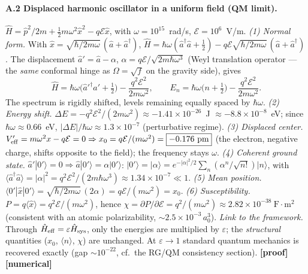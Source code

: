 \documentclass[11pt,a4paper]{article}
\newcommand{\st}[1]{\textbf{\textcolor{blue!45!black}{[#1]}}}
\begin{document}
\paragraph{A.2 Displaced harmonic oscillator in a uniform field (QM limit).}
$\hat H=\hat p^2/2m+\tfrac12 m\omega^2\hat x^2-q\mathcal{E}\hat x$, with $\omega=10^{15}$~rad/s, $\mathcal{E}=10^{6}$~V/m.
\emph{(1) Normal form.} With $\hat x=\sqrt{\hbar/2m\omega}\,(\hat a+\hat a^\dagger)$,
$\hat H=\hbar\omega(\hat a^\dagger\hat a+\tfrac12)-q\mathcal{E}\sqrt{\hbar/2m\omega}\,(\hat a+\hat a^\dagger)$. The displacement $\hat a'=\hat a-\alpha$, $\alpha=q\mathcal{E}/\sqrt{2m\hbar\omega^3}$ (Weyl translation operator --- the \emph{same} conformal hinge as $\Omega=\sqrt f$ on the gravity side), gives
\begin{equation}
\hat H=\hbar\omega\Big(\hat a'^\dagger\hat a'+\tfrac12\Big)-\frac{q^2\mathcal{E}^2}{2m\omega^2},\qquad
E_n=\hbar\omega\Big(n+\tfrac12\Big)-\frac{q^2\mathcal{E}^2}{2m\omega^2}. \tag{A.2}
\end{equation}
The spectrum is rigidly shifted, levels remaining equally spaced by $\hbar\omega$.
\emph{(2) Energy shift.} $\Delta E=-q^2\mathcal{E}^2/(2m\omega^2)\approx-1.41\times10^{-26}$~J $\approx-8.8\times10^{-8}$~eV; since $\hbar\omega\approx0.66$~eV, $|\Delta E|/\hbar\omega\approx1.3\times10^{-7}$ (perturbative regime).
\emph{(3) Displaced center.} $V_{\rm eff}'=m\omega^2x-q\mathcal{E}=0\Rightarrow x_0=q\mathcal{E}/(m\omega^2)=\boxed{-0.176~\text{pm}}$ (the electron, negative charge, shifts opposite to the field); the frequency stays $\omega$.
\emph{(4) Coherent ground state.} $\hat a'|0'\rangle=0\Rightarrow\hat a|0'\rangle=\alpha|0'\rangle$: $|0'\rangle=|\alpha\rangle=e^{-|\alpha|^2/2}\sum_n(\alpha^n/\sqrt{n!})|n\rangle$, with $\langle\hat a^\dagger\hat a\rangle=|\alpha|^2=q^2\mathcal{E}^2/(2m\hbar\omega^3)\approx\boxed{1.34\times10^{-7}}\ll1$.
\emph{(5) Mean position.} $\langle0'|\hat x|0'\rangle=\sqrt{\hbar/2m\omega}\,(2\alpha)=q\mathcal{E}/(m\omega^2)=x_0$.
\emph{(6) Susceptibility.} $P=q\langle\hat x\rangle=q^2\mathcal{E}/(m\omega^2)$, hence $\chi=\partial P/\partial\mathcal{E}=q^2/(m\omega^2)\approx\boxed{2.82\times10^{-38}~\text{F}\cdot\text{m}^2}$ (consistent with an atomic polarizability, $\sim2.5\times10^{-3}\,a_0^3$).
\emph{Link to the framework.} Through $\hat H_{\rm eff}=\varepsilon\hat H_{\rm sys}$, only the energies are multiplied by $\varepsilon$; the \emph{structural} quantities ($x_0$, $\langle n\rangle$, $\chi$) are unchanged. At $\varepsilon\to1$ standard quantum mechanics is recovered exactly (gap $\sim10^{-22}$, cf.\ the RG/QM consistency section). \st{proof}\st{numerical}
\normalsize
\end{document}

